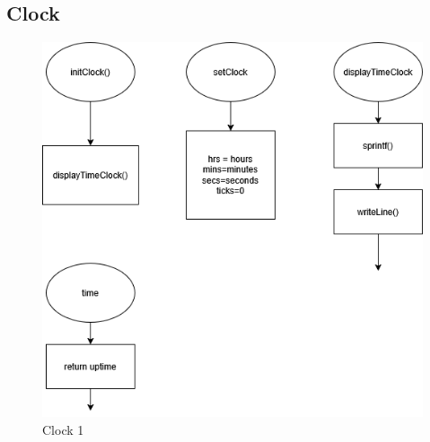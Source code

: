 \documentclass[a4paper,12pt]{article}
\begin{document}
\subsection{Clock}

\begin{figure}[H]
    \centering
    \includegraphics[width=1\textwidth]{diagrams/3.clock1.png}
    \caption{Clock 1}
    \label{fig:Clock1}
\end{figure}
\end{document}
